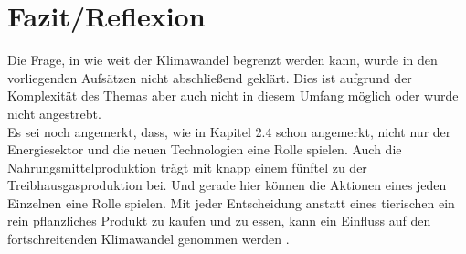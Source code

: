\chapter{Fazit/Reflexion}
Die Frage, in wie weit der Klimawandel begrenzt werden kann, wurde in den vorliegenden Aufsätzen nicht abschließend geklärt. Dies ist aufgrund der Komplexität des Themas aber auch nicht in diesem Umfang möglich oder wurde nicht angestrebt.\\
Es sei noch angemerkt, dass, wie in Kapitel 2.4 schon angemerkt, nicht nur der Energiesektor und die neuen Technologien eine Rolle spielen. Auch die Nahrungsmittelproduktion trägt mit knapp einem fünftel zu der Treibhausgasproduktion bei. Und gerade hier können die Aktionen eines jeden Einzelnen eine Rolle spielen. Mit jeder Entscheidung anstatt eines tierischen ein rein pflanzliches Produkt zu kaufen und zu essen, kann ein Einfluss auf den fortschreitenden Klimawandel genommen werden \cite{poore_reducing_2018}.\\
